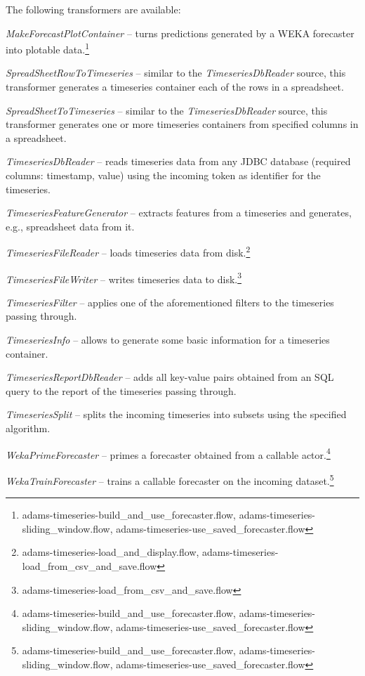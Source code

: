 \documentclass[a4paper]{book}
\begin{document}
\noindent The following transformers are available:
\begin{tight_itemize}
	\item \textit{MakeForecastPlotContainer} -- turns predictions generated
	by a WEKA forecaster into plotable data.\footnote{adams-timeseries-build\_and\_use\_forecaster.flow, adams-timeseries-sliding\_window.flow, adams-timeseries-use\_saved\_forecaster.flow}
	\item \textit{SpreadSheetRowToTimeseries} -- similar to the 
	\textit{TimeseriesDbReader} source, this transformer generates a 
	timeseries container each of the rows in a spreadsheet.
	\item \textit{SpreadSheetToTimeseries} -- similar to the 
	\textit{TimeseriesDbReader} source, this transformer generates one or more
	timeseries containers from specified columns in a spreadsheet.
	\item \textit{TimeseriesDbReader} -- reads timeseries data from any
	JDBC database (required columns: timestamp, value) using the incoming 
	token as identifier for the timeseries.
	\item \textit{TimeseriesFeatureGenerator} -- extracts features from a
	timeseries and generates, e.g., spreadsheet data from it.
	\item \textit{TimeseriesFileReader} -- loads timeseries data from 
	disk.\footnote{adams-timeseries-load\_and\_display.flow, adams-timeseries-load\_from\_csv\_and\_save.flow}
	\item \textit{TimeseriesFileWriter} -- writes timeseries data to 
	disk.\footnote{adams-timeseries-load\_from\_csv\_and\_save.flow}
	\item \textit{TimeseriesFilter} -- applies one of the aforementioned filters
	to the timeseries passing through.
	\item \textit{TimeseriesInfo} -- allows to generate some basic information
	for a timeseries container.
	\item \textit{TimeseriesReportDbReader} -- adds all key-value pairs obtained
	from an SQL query to the report of the timeseries passing through.
	\item \textit{TimeseriesSplit} -- splits the incoming timeseries into
	subsets using the specified algorithm.
	\item \textit{WekaPrimeForecaster} -- primes a forecaster obtained from
	a callable actor.\footnote{adams-timeseries-build\_and\_use\_forecaster.flow, adams-timeseries-sliding\_window.flow, adams-timeseries-use\_saved\_forecaster.flow}
	\item \textit{WekaTrainForecaster} -- trains a callable forecaster
	on the incoming dataset.\footnote{adams-timeseries-build\_and\_use\_forecaster.flow, adams-timeseries-sliding\_window.flow, adams-timeseries-use\_saved\_forecaster.flow}
\end{tight_itemize}
\end{document}
